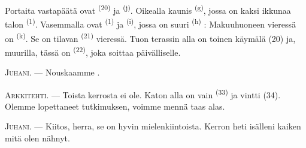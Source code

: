 \VUsaut{3.0mm}
\VUsaut{3.0mm}

Portaita vastapäätä ovat  \textsuperscript{(20)} ja
 \textsuperscript{(j)}. Oikealla kaunis 
\textsuperscript{(g)}, jossa on kaksi ikkunaa talon 
\textsuperscript{(1)}. Vasemmalla ovat 
\textsuperscript{(1)} ja  \textsuperscript{(i)}, jossa on
suuri  \textsuperscript{(h)} : Makuuhuoneen vieressä on
 \textsuperscript{(k)}. Se on tilavan 
\textsuperscript{(21)} vieressä. Tuon terassin alla on toinen käymälä (20) ja,
muurilla, tässä on  \textsuperscript{(22)}, joka soittaa
päivälliselle.

\textsc{Juhani}. --- Nouskaamme .

\textsc{Arkkitehti}. --- Toista kerrosta ei ole. Katon alla on vain
 \textsuperscript{(33)} ja vintti (34). Olemme
lopettaneet tutkimuksen, voimme mennä taas alas.

\textsc{Juhani}. --- Kiitos, herra, se on hyvin mielenkiintoista. Kerron heti
isälleni kaiken mitä olen nähnyt.
\VUsaut{4.0mm}
\VUfilet{22mm}
